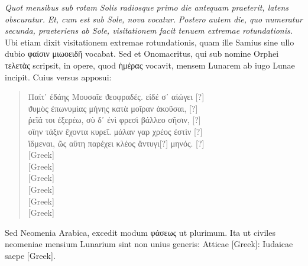 \textit{Quot mensibus sub rotam Solis radiosque primo die
antequam praeterit, latens obscuratur.}
 \textit{Et, cum est sub Sole, nova vocatur.}
\textit{Postero autem die, quo numeratur secunda,
 praeteriens ab Sole, visitationem
facit tenuem extremae rotundationis.}
Ubi etiam dixit visitationem
extremae rotundationis, quam ille Samius sine ullo dubio
 \textgreek{φαίσιν μιωοειδῆ} vocabat.
Sed et Onomacritus, qui sub nomine Orphei
 \textgreek{τελετὰς}
scripsit, in opere, quod
 \textgreek{ἡμέρας}
 vocavit, mensem Lunarem ab iugo Lunae
incipit.
Cuius versus apposui:
\begin{quote}
\begin{greek}
Παίτ᾽ ἐδάης Μουσαῖε ϑεοφραδἐς. εἰδέ σ᾽ αἰώγει [?]\\
ϑυμὸς ἐπωνυμίας μήνης κατὰ μοῖραν ἀκοῦσαι, [?]\\
ῤεῖά τοι ἐξερέω, σὺ δ᾽ ἐνὶ φρεσὶ βάλλεο σῆσιν, [?]\\
οἵην τάξιν ἔχοντα κυρεῖ. μάλαν γαρ χρέος ἐστὶν [?]\\
ἴδμεναι, ῶς αὕτη παρέχει κλέος ἄντυγι[?] μηνός. [?]\\
\textgreek{[Greek]}\\
\textgreek{[Greek]}\\
\textgreek{[Greek]}\\
\textgreek{[Greek]}\\
\textgreek{[Greek]}\\
\textgreek{[Greek]}
\end{greek}
\end{quote}
Sed Neomenia Arabica, excedit modum
 \textgreek{φάσεως} ut plurimum.
Ita ut
civiles neomeniae mensium Lunarium sint non unius generis: Atticae
\textgreek{[Greek]}: Iudaicae saepe \textgreek{[Greek]}.
